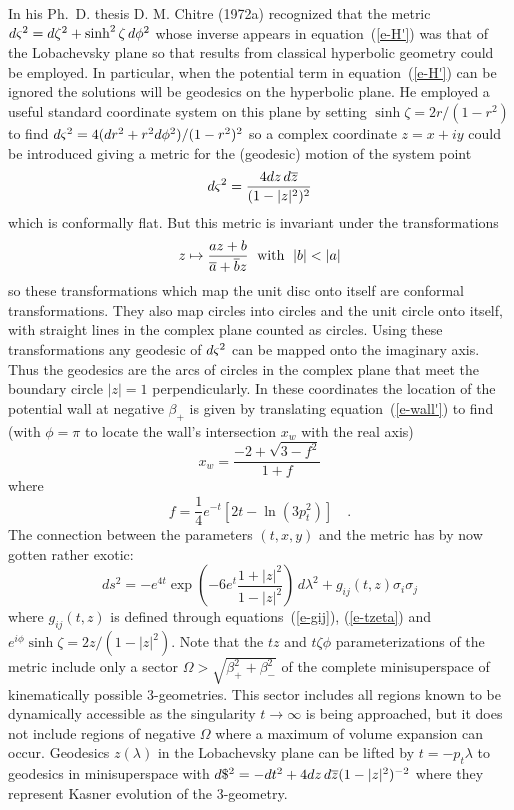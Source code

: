 In his Ph.\ D. thesis D. M. Chitre (1972a) recognized that the metric
$d\varsigma^2 = d\zeta^2 + \sinh^2\zeta\,d\phi^2$ whose inverse appears in
equation~(\ref{e-H'}) was that of the Lobachevsky plane so that
results from classical hyperbolic geometry could be employed.  In
particular, when the potential term in equation~(\ref{e-H'}) can be
ignored the solutions will be geodesics on the hyperbolic plane.  He
employed a useful standard coordinate system on this plane by setting
$\sinh\zeta = 2r/(1-r^2)$ to find $d\varsigma^2 = 4(dr^2 + r^2
d\phi^2)/(1-r^2)^2$ so a complex coordinate $z = x + iy$ could be
introduced giving a metric for the (geodesic) motion of the system
point
\begin{equation}
  d\varsigma^2 = \frac{4 dz\,d\overline{z}}{(1-|z|^2)^2}
\end{equation}
which is conformally flat. But this metric is invariant under the
transformations
\begin{equation}\label{e-xfn}
z \mapsto \frac{az+b}{\overline{a} + \overline{b}z}
        {\textstyle \rm \ \; with\ \;} |b| < |a|
\end{equation}
so these transformations which map the unit disc onto itself are
conformal transformations.  They also map circles into circles
and the unit circle onto itself, with straight lines in the complex
plane counted as circles.  Using these transformations any
geodesic of $d\varsigma^2$ can be mapped onto the imaginary axis.  Thus the
geodesics are the arcs of circles in the complex plane that meet the
boundary circle $|z| = 1$ perpendicularly.  In these coordinates the
location of the potential wall at negative $\beta_+$ is given by
translating equation~(\ref{e-wall'}) to find (with $\phi = \pi$ to
locate the wall's intersection $x_w$ with the real axis)
\begin{equation}\label{e-xw}
  x_w = \frac{-2+\sqrt{3-f^2}}{1+f}
 \end{equation}
where
\begin{equation}
  f = \mbox{$\frac{1}{4}$} e^{-t}[2t - \ln (3p_t^2)] \quad .
\end{equation}
The connection between the parameters $(t,x,y)$ and the metric has by
now gotten rather exotic:
\begin{equation}
   ds^2 = -e^{4t}\exp(-6e^t\frac{1+|z|^2}{1-|z|^2})\,d\lambda^2
                  + g_{ij}(t,z)\sigma_i \sigma_j
\end{equation}
where $g_{ij}(t,z)$ is defined through equations~(\ref{e-gij}),
(\ref{e-tzeta}) and $e^{i\phi}\sinh\zeta = 2z/(1-|z|^2)$.  Note that
the $tz$ and $t\zeta\phi$ parameterizations of the metric include
only a sector $\Omega > \sqrt{\beta_+^2 + \beta_-^2}$ of the complete
minisuperspace of kinematically possible 3-geometries.  This sector
includes all regions known to be dynamically accessible as the
singularity $t \rightarrow \infty$ is being approached, but it does
not include regions of negative $\Omega$ where a maximum of volume
expansion can occur.  Geodesics $z(\lambda)$ in the Lobachevsky plane
can be lifted by $t = -p_t \lambda$ to geodesics in minisuperspace
with $d\$^2 = - dt^2 + 4 dz\,d\overline{z}(1-|z|^2)^{-2}$ where they represent
Kasner evolution of the 3-geometry.

